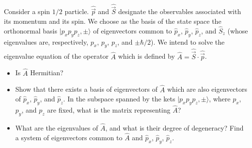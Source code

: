 \documentclass[10pt,a4paper]{article}
\newenvironment{problem}[2][Problem]{\begin{trivlist}
\item[\hskip \labelsep {\bfseries #1}\hskip \labelsep {\bfseries #2.}]}{\end{trivlist}}
\begin{document}
\begin{problem}{2}
[C-T Exercise 9-2] Consider a spin $1/2$ particle. $\hat{\vec{p}}$ and $\hat{\vec{S}}$ designate the observables  associated with its momentum and its spin. We choose as the basis of the state space the orthonormal basis $|p_xp_yp_z,\pm\rangle$ of eigenvectors common to $\hat{p}_x$, $\hat{p}_y$, $\hat{p}_z$, and $\hat{S}_z$ (whose eigenvalues are, respectively, $p_x$, $p_y$, $p_z$, and $\pm\hbar/2$). We intend to solve the eigenvalue equation of the operator $\hat{A}$ which is defined by $\hat{A}=\hat{\vec{S}}\cdot\hat{\vec{p}}$.
\begin{itemize}
\item[(a)] Is $\hat{A}$ Hermitian?
\item[(b)] Show that there exists a basis of eigenvectors of $\hat{A}$ which are also eigenvectors of $\hat{p}_x$, $\hat{p}_y$, and $\hat{p}_z$. In the subspace spanned by the kets $|p_xp_yp_z,\pm\rangle$, where $p_x$, $p_y$, and $p_z$ are fixed, what is the matrix representing $\hat{A}$?
\item[(c)] What are the eigenvalues of $\hat{A}$,  and what is their degree of degeneracy? Find a system of eigenvectors common to $\hat{A}$ and $\hat{p}_x$, $\hat{p}_y$, $\hat{p}_z$.
\end{itemize}
\end{problem}
\end{document}
